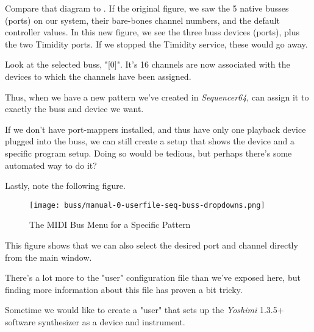    Compare that diagram to .
   If the original figure, we saw the 5 native busses (ports) on our system,
   their bare-bones channel numbers, and the default controller values.  In
   this new figure, we see the three buss devices (ports), plus the two
   Timidity ports.  If we stopped the Timidity service, these would go away.

   Look at the selected buss, "[0]".  It's 16 channels are now associated with
   the devices to which the channels have been assigned.

   Thus, when we have a new pattern we've created in \textsl{Sequencer64},
   can assign it to exactly the buss and device we want.

   If we don't have port-mappers installed, and thus have only one playback
   device plugged into the buss, we can still create a setup that
   shows the device and a specific program setup.  Doing so would be tedious,
   but perhaps there's some automated way to do it?

   Lastly, note the following figure.

\begin{figure}[H]
   \centering 
   \texttt{[image: buss/manual-0-userfile-seq-buss-dropdowns.png]}
   \caption{The MIDI Bus Menu for a Specific Pattern}
   \label{fig:seq64_manual_0_userfile_seq_buss_dropdown}
\end{figure}

   This figure shows that we can also select the desired port and channel
   directly from the main window.

   There's a lot more to the "user" configuration file than we've exposed here,
   but finding more information about this file has proven a bit tricky.

   Sometime we would like to create a "user" that sets up the
   \textsl{Yoshimi} 1.3.5+ software synthesizer as a device and instrument.

